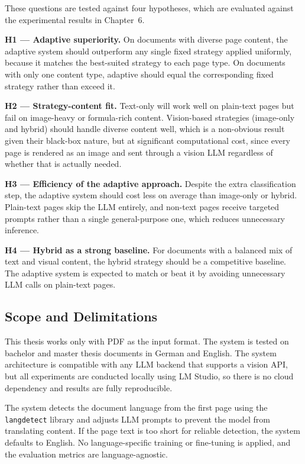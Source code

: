\documentclass[12pt]{article}
\begin{document}
These questions are tested against four hypotheses, which are evaluated against
the experimental results in Chapter~6.

\textbf{H1 --- Adaptive superiority.} On documents with diverse page content,
the adaptive system should outperform any single fixed strategy applied
uniformly, because it matches the best-suited strategy to each page type.
On documents with only one content type, adaptive should equal the
corresponding fixed strategy rather than exceed it.

\textbf{H2 --- Strategy-content fit.} Text-only will work well on plain-text
pages but fail on image-heavy or formula-rich content. Vision-based strategies
(image-only and hybrid) should handle diverse content well, which is a non-obvious result given their
black-box nature, but at significant computational cost, since every page is rendered as an image and sent through
a vision LLM regardless of whether that is actually needed.

\textbf{H3 --- Efficiency of the adaptive approach.} Despite the extra
classification step, the adaptive system should cost less on average than
image-only or hybrid. Plain-text pages skip the LLM entirely, and non-text
pages receive targeted prompts rather than a single general-purpose one,
which reduces unnecessary inference.

\textbf{H4 --- Hybrid as a strong baseline.} For documents with a balanced
mix of text and visual content, the hybrid strategy should be a competitive
baseline. The adaptive system is expected to match or beat it by avoiding
unnecessary LLM calls on plain-text pages.

\subsection{Scope and Delimitations}

This thesis works only with PDF as the input format. The system is tested
on bachelor and master thesis documents in German and English. The system
architecture is compatible with any LLM backend that supports a vision API,
but all experiments are conducted locally using LM Studio, so there is no
cloud dependency and results are fully reproducible.

The system detects the document language from the first page using the
\texttt{langdetect} library and adjusts LLM prompts to prevent the model
from translating content. If the page text is too short for reliable
detection, the system defaults to English. No language-specific training or
fine-tuning is applied, and the evaluation metrics are language-agnostic.
\end{document}
